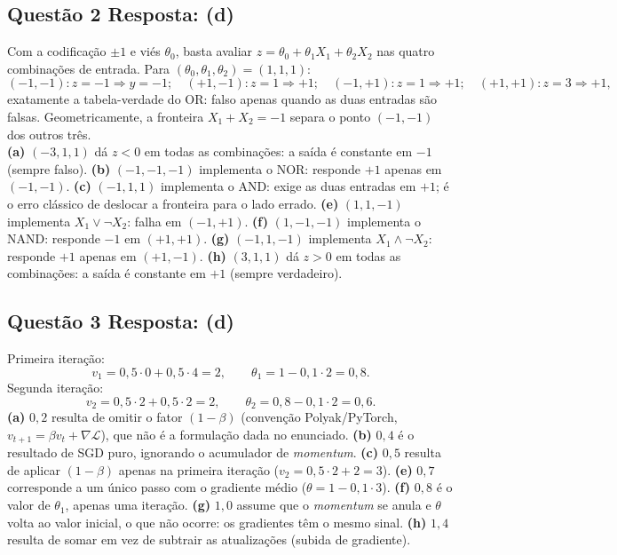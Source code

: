 \documentclass[11pt,a4paper]{article}
\begin{document}
\subsection*{Questão 2 \textemdash{} Resposta: (d)}
Com a codificação $\pm 1$ e viés $\theta_0$, basta avaliar $z = \theta_0 + \theta_1 X_1 + \theta_2 X_2$ nas quatro combinações de entrada. Para $(\theta_0, \theta_1, \theta_2) = (1, 1, 1)$:
\[
(-1,-1)\!: z = -1 \Rightarrow \hat{y} = -1; \quad
(+1,-1)\!: z = 1 \Rightarrow +1; \quad
(-1,+1)\!: z = 1 \Rightarrow +1; \quad
(+1,+1)\!: z = 3 \Rightarrow +1,
\]
exatamente a tabela-verdade do OR: falso apenas quando as duas entradas são falsas. Geometricamente, a fronteira $X_1 + X_2 = -1$ separa o ponto $(-1,-1)$ dos outros três.\\
\textbf{(a)} $(-3, 1, 1)$ dá $z < 0$ em todas as combinações: a saída é constante em $-1$ (sempre falso).
\textbf{(b)} $(-1, -1, -1)$ implementa o NOR: responde $+1$ apenas em $(-1,-1)$.
\textbf{(c)} $(-1, 1, 1)$ implementa o AND: exige as duas entradas em $+1$; é o erro clássico de deslocar a fronteira para o lado errado.
\textbf{(e)} $(1, 1, -1)$ implementa $X_1 \lor \lnot X_2$: falha em $(-1, +1)$.
\textbf{(f)} $(1, -1, -1)$ implementa o NAND: responde $-1$ em $(+1,+1)$.
\textbf{(g)} $(-1, 1, -1)$ implementa $X_1 \land \lnot X_2$: responde $+1$ apenas em $(+1,-1)$.
\textbf{(h)} $(3, 1, 1)$ dá $z > 0$ em todas as combinações: a saída é constante em $+1$ (sempre verdadeiro).

\subsection*{Questão 3 \textemdash{} Resposta: (d)}
Primeira iteração:
\[
v_1 = 0{,}5 \cdot 0 + 0{,}5 \cdot 4 = 2, \qquad \theta_1 = 1 - 0{,}1 \cdot 2 = 0{,}8.
\]
Segunda iteração:
\[
v_2 = 0{,}5 \cdot 2 + 0{,}5 \cdot 2 = 2, \qquad \theta_2 = 0{,}8 - 0{,}1 \cdot 2 = 0{,}6.
\]
\textbf{(a)} $0{,}2$ resulta de omitir o fator $(1-\beta)$ (convenção Polyak/PyTorch, $v_{t+1} = \beta v_t + \nabla\mathcal{L}$), que não é a formulação dada no enunciado.
\textbf{(b)} $0{,}4$ é o resultado de SGD puro, ignorando o acumulador de \textit{momentum}.
\textbf{(c)} $0{,}5$ resulta de aplicar $(1-\beta)$ apenas na primeira iteração ($v_2 = 0{,}5\cdot 2 + 2 = 3$).
\textbf{(e)} $0{,}7$ corresponde a um único passo com o gradiente médio ($\theta = 1 - 0{,}1 \cdot 3$).
\textbf{(f)} $0{,}8$ é o valor de $\theta_1$, apenas uma iteração.
\textbf{(g)} $1{,}0$ assume que o \textit{momentum} se anula e $\theta$ volta ao valor inicial, o que não ocorre: os gradientes têm o mesmo sinal.
\textbf{(h)} $1{,}4$ resulta de somar em vez de subtrair as atualizações (subida de gradiente).
\end{document}

